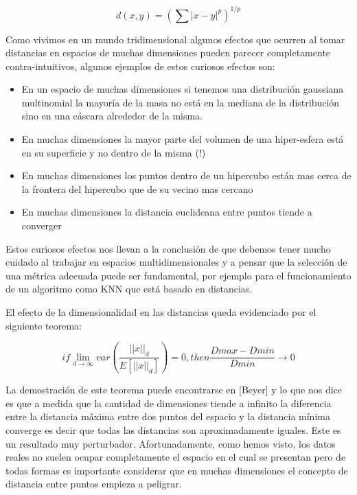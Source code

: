 $$d(x,y)=(\sum |x-y|^p)^{1/p}$$

Como vivimos en un mundo tridimensional algunos efectos que ocurren al tomar distancias en espacios de muchas dimensiones pueden parecer completamente contra-intuitivos, algunos ejemplos de estos curiosos efectos son:

\begin{itemize}
\item En un espacio de muchas dimensiones si tenemos una distribución gaussiana multinomial la mayoría de la masa no está en la mediana de la distribución sino en una cáscara alrededor de la misma.
\item En muchas dimensiones la mayor parte del volumen de una hiper-esfera está en su superficie y no dentro de la misma (!)
\item En muchas dimensiones los puntos dentro de un hipercubo están mas cerca de la frontera del hipercubo que de su vecino mas cercano
\item En muchas dimensiones la distancia euclideana entre puntos tiende a converger
\end{itemize}

Estos curiosos efectos nos llevan a la conclusión de que debemos tener mucho cuidado al trabajar en espacios multidimensionales y a pensar que la selección de una métrica adecuada puede ser fundamental, por ejemplo para el funcionamiento de un algoritmo como KNN que está basado en distancias.

El efecto de la dimensionalidad en las distancias queda evidenciado por el siguiente teorema:

\begin{theorem}[Beyer]
$$if \lim_{d  \to \infty} var(\frac{||x||_d}{E[||x||_d]}) = 0, then \frac{Dmax-Dmin}{Dmin} \to 0$$
\end{theorem}

La demostración de este teorema puede encontrarse en [Beyer] y lo que nos dice es que a medida que la cantidad de dimensiones tiende a infinito la diferencia entre la distancia máxima entre dos puntos del espacio y la distancia mínima converge es decir que todas las distancias son aproximadamente iguales. Este es un resultado muy perturbador. Afortunadamente, como hemos visto, los datos reales no suelen ocupar completamente el espacio en el cual se presentan pero de todas formas es importante considerar que en muchas dimensiones el concepto de distancia entre puntos empieza a peligrar.

